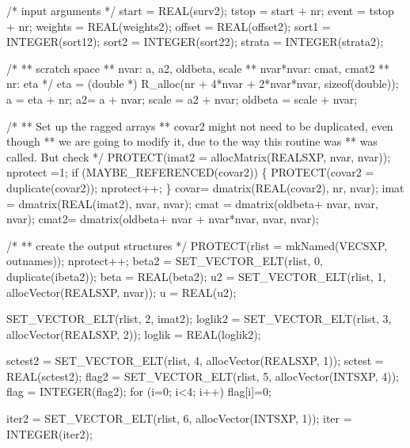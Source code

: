 \documentclass{article}
\begin{document}
\begin{nwchunk}
     /* input arguments */
     start = REAL(surv2);
     tstop  = start + nr;
     event = tstop + nr;
     weights = REAL(weights2);
     offset = REAL(offset2);
     sort1  = INTEGER(sort12);
     sort2  = INTEGER(sort22);
     strata = INTEGER(strata2);
 
     /*
     ** scratch space
     **  nvar: a, a2, oldbeta, scale
     **  nvar*nvar: cmat, cmat2
     **  nr:  eta
     */
     eta = (double *) R_alloc(nr + 4*nvar + 2*nvar*nvar, sizeof(double));
     a = eta + nr;
     a2= a + nvar;
     scale  = a2 + nvar;
     oldbeta = scale + nvar;
             
     /*
     **  Set up the ragged arrays
     **  covar2 might not need to be duplicated, even though
     **  we are going to modify it, due to the way this routine was
     **  was called.  But check
     */
     PROTECT(imat2 = allocMatrix(REALSXP, nvar, nvar));
     nprotect =1;
     if (MAYBE_REFERENCED(covar2)) \{
         PROTECT(covar2 = duplicate(covar2)); 
         nprotect++;
         \}
     covar= dmatrix(REAL(covar2), nr, nvar);
     imat = dmatrix(REAL(imat2),  nvar, nvar);
     cmat = dmatrix(oldbeta+ nvar,   nvar, nvar);
     cmat2= dmatrix(oldbeta+ nvar + nvar*nvar, nvar, nvar);
 
     /*
     ** create the output structures
     */
     PROTECT(rlist = mkNamed(VECSXP, outnames));
     nprotect++;
     beta2 = SET_VECTOR_ELT(rlist, 0, duplicate(ibeta2));
     beta  = REAL(beta2);
     u2 =    SET_VECTOR_ELT(rlist, 1, allocVector(REALSXP, nvar));
     u = REAL(u2);
 
     SET_VECTOR_ELT(rlist, 2, imat2);
     loglik2 = SET_VECTOR_ELT(rlist, 3, allocVector(REALSXP, 2)); 
     loglik  = REAL(loglik2);
 
     sctest2 = SET_VECTOR_ELT(rlist, 4, allocVector(REALSXP, 1));
     sctest =  REAL(sctest2);
     flag2  =  SET_VECTOR_ELT(rlist, 5, allocVector(INTSXP, 4));
     flag   =  INTEGER(flag2);
     for (i=0; i<4; i++) flag[i]=0;
 
     iter2  =  SET_VECTOR_ELT(rlist, 6, allocVector(INTSXP, 1));
     iter = INTEGER(iter2);
                 

\end{nwchunk}
\end{document}
